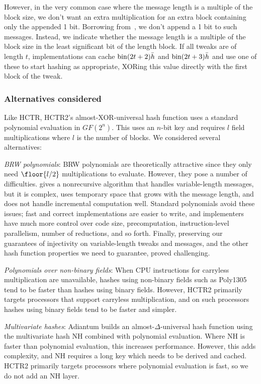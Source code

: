 \documentclass[hctr.tex]{subfiles}
\begin{document}
However, in the very common case where 
the message length is a multiple of the block size,
we don't want an extra multiplication
for an extra block containing only the appended 1 bit.
Borrowing from~\cite{xcbc},
we don't append a 1 bit to such messages.
Instead, we indicate whether
the message length is a multiple of the block size
in the least significant bit of the length block.
If all tweaks are of length \(t\), implementations can cache
\(\operatorname{bin}(2t + 2)\bar{h}\) and \(\operatorname{bin}(2t + 3)\bar{h}\)
and use one of these to start hashing as appropriate,
XORing this value directly with the first block of the tweak.

\subsubsection{Alternatives considered}

Like HCTR, HCTR2's almost-XOR-universal hash function uses a standard polynomial
evaluation in $GF(2^n)$. This uses an $n$-bit key and requires $l$ field
multiplications where $l$ is the number of blocks.
We considered several alternatives:

\emph{BRW polynomials}: BRW polynomials\cite{pema}\cite{heh2} are theoretically
attractive since they only need \(\floor{l/2}\) multiplications
to evaluate. However, they pose a number of difficulties. \cite{brweval} gives a
nonrecursive algorithm that handles variable-length messages, but it is complex,
uses temporary space that grows with the message length, and does not handle
incremental computation well. Standard polynomials avoid these issues;
fast and correct implementations are easier to write,
and implementers have much more control over
code size, precomputation, instruction-level
parallelism, number of reductions, and so forth.
Finally, preserving our guarantees of injectivity on variable-length
tweaks and messages, and the other hash function properties we need
to guarantee, proved challenging.

\emph{Polynomials over non-binary fields}: When CPU instructions for carryless
multiplication are unavailable, hashes using non-binary fields such as
Poly1305\cite{poly1305} tend to be faster than hashes using binary fields.
However, HCTR2 primarily targets
processors that support carryless multiplication, 
and on such processors hashes
using binary fields tend to be faster and simpler.

\emph{Multivariate hashes}: Adiantum\cite{adiantum} builds an
almost-$\Delta$-universal hash function using the multivariate hash
NH\cite{umac1} combined with polynomial evaluation. Where NH is faster than
polynomial evaluation, this increases performance. However, this adds
complexity, and NH requires a long key which needs to be derived and cached. 
HCTR2 primarily targets processors where polynomial evaluation is fast, so
we do not add an NH layer.
\end{document}
